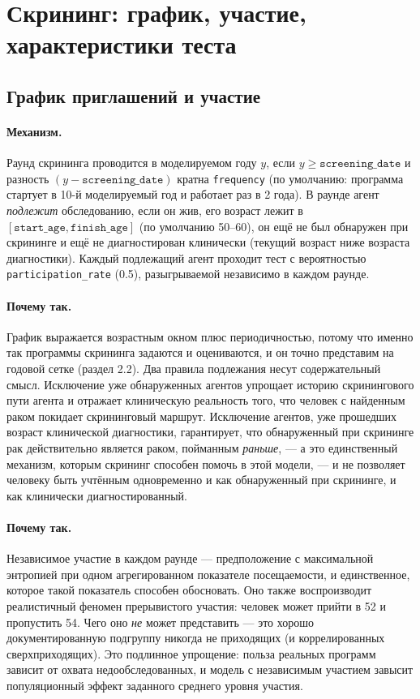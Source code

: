 \documentclass[12pt,a4paper]{article}
\newcommand{\id}[1]{\texttt{#1}}
\newcommand{\mech}[1]{\paragraph{Механизм.} #1}
\newcommand{\why}[1]{\paragraph{Почему так.} #1}
\begin{document}
\section{Скрининг: график, участие, характеристики теста}

\subsection{График приглашений и участие}

\mech{Раунд скрининга проводится в моделируемом году $y$, если $y \ge \id{screening\_date}$ и разность
$(y - \id{screening\_date})$ кратна \id{frequency} (по умолчанию: программа стартует в 10-й моделируемый год и
работает раз в 2 года). В раунде агент \emph{подлежит} обследованию, если он жив, его возраст лежит в
$[\id{start\_age}, \id{finish\_age}]$ (по умолчанию 50--60), он ещё не был обнаружен при скрининге и ещё не
диагностирован клинически (текущий возраст ниже возраста диагностики). Каждый подлежащий агент проходит тест
с вероятностью \id{participation\_rate} (0.5), разыгрываемой независимо в каждом раунде.}

\why{График выражается возрастным окном плюс периодичностью, потому что именно так программы скрининга
задаются и оцениваются, и он точно представим на годовой сетке (раздел 2.2). Два правила подлежания несут
содержательный смысл. Исключение уже обнаруженных агентов упрощает историю скринингового пути агента и
отражает клиническую реальность того, что человек с найденным раком покидает скрининговый маршрут.
Исключение агентов, уже прошедших возраст клинической диагностики, гарантирует, что обнаруженный при
скрининге рак действительно является раком, пойманным \emph{раньше}, --- а это единственный механизм, которым
скрининг способен помочь в этой модели, --- и не позволяет человеку быть учтённым одновременно и как
обнаруженный при скрининге, и как клинически диагностированный.}

\why{Независимое участие в каждом раунде --- предположение с максимальной энтропией при одном агрегированном
показателе посещаемости, и единственное, которое такой показатель способен обосновать. Оно также
воспроизводит реалистичный феномен прерывистого участия: человек может прийти в 52 и пропустить 54. Чего оно
\emph{не} может представить --- это хорошо документированную подгруппу никогда не приходящих (и
коррелированных сверхприходящих). Это подлинное упрощение: польза реальных программ зависит от охвата
недообследованных, и модель с независимым участием завысит популяционный эффект заданного среднего уровня
участия.}
\end{document}
